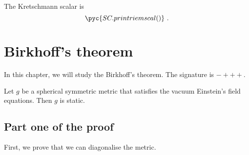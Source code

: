     The Kretschmann scalar is 
    \begin{equation}\label{krescal}
        \pyc{SC.printriemscal()} ~.
    \end{equation}

\chapter{Birkhoff's theorem}

    In this chapter, we will study the Birkhoff's theorem. The signature is $-+++$.

    \begin{theorem}[Birkhoff]\label{birk}
        Let $g$ be a spherical symmetric metric that satisfies the vacuum Einstein's field equations. Then $g$ is static.
    \end{theorem}

\section{Part one of the proof}

    First, we prove that we can diagonalise the metric.

